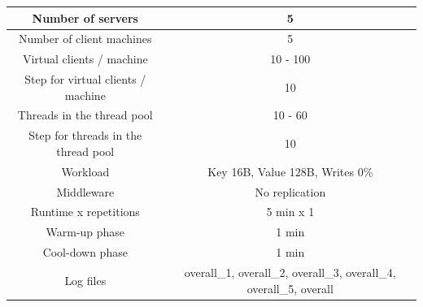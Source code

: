 \documentclass[11pt]{article}
\begin{document}
\small{
\smallskip
\begin{tabular}{|c|c|}
\hline Number of servers & 5 \\ 
\hline Number of client machines & 5 \\ 
\hline Virtual clients / machine & 10 - 100 \\ 
\hline Step for virtual clients / machine & 10 \\ 
\hline Threads in the thread pool & 10 - 60 \\
\hline Step for threads in the thread pool & 10 \\
\hline Workload & Key 16B, Value 128B, Writes 0\% \\
\hline Middleware & No replication \\ 
\hline Runtime x repetitions & 5 min x 1 \\ 
\hline Warm-up phase & 1 min \\
\hline Cool-down phase & 1 min \\

\hline Log files & overall\_1, overall\_2, overall\_3, overall\_4, overall\_5, overall \\
\hline 
\end{tabular} }
\medskip
\end{document}
